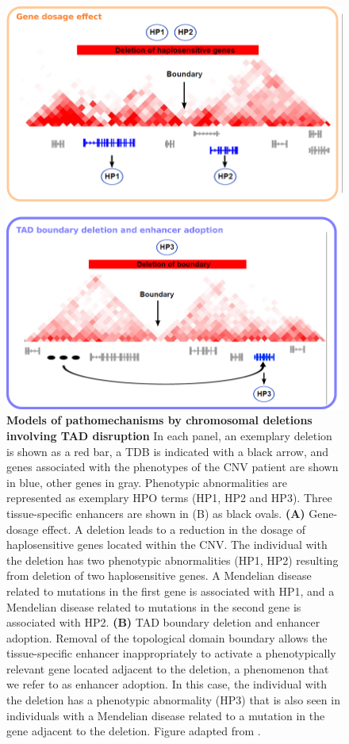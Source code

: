 \documentclass[a4paper,twoside=true,openright,parskip=full,chapterprefix=true,11pt,headings=normal,bibliography=totoc,listof=totoc,titlepage=on,captions=tableabove,draft=false]{scrreprt}
\theoremstyle{definition}
\theoremstyle{definition}
\theoremstyle{definition}
\theoremstyle{remark}
\begin{document}
\begin{figure}

{\centering \includegraphics[width=0.6\linewidth]{figures/GDE_vs_TDBD_v03} 

}

\caption{\textbf{Models of pathomechanisms by
chromosomal deletions involving TAD disruption} In each panel, an
exemplary deletion is shown as a red bar, a TDB is indicated with a
black arrow, and genes associated with the phenotypes of the CNV patient
are shown in blue, other genes in gray. Phenotypic abnormalities are
represented as exemplary HPO terms (HP1, HP2 and HP3). Three
tissue-specific enhancers are shown in (B) as black ovals. \textbf{(A)}
Gene-dosage effect. A deletion leads to a reduction in the dosage of
haplosensitive genes located within the CNV. The individual with the
deletion has two phenotypic abnormalities (HP1, HP2) resulting from
deletion of two haplosensitive genes. A Mendelian disease related to
mutations in the first gene is associated with HP1, and a Mendelian
disease related to mutations in the second gene is associated with HP2.
\textbf{(B)} TAD boundary deletion and enhancer adoption. Removal of the
topological domain boundary allows the tissue-specific enhancer
inappropriately to activate a phenotypically relevant gene located
adjacent to the deletion, a phenomenon that we refer to as enhancer
adoption. In this case, the individual with the deletion has a
phenotypic abnormality (HP3) that is also seen in individuals with a
Mendelian disease related to a mutation in the gene adjacent to the
deletion. Figure adapted from \citep{Ibn-Salem2014}.}\label{fig:EnhancerAdoption}
\end{figure}
\end{document}
